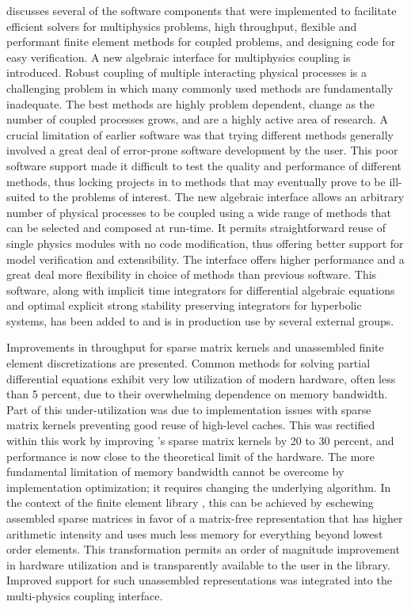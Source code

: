  discusses several of the software components that were implemented to facilitate efficient solvers for multiphysics problems, high throughput, flexible and performant finite element methods for coupled problems, and designing code for easy verification.
A new algebraic interface for multiphysics coupling is introduced.
Robust coupling of multiple interacting physical processes is a challenging problem in which many commonly used methods are fundamentally inadequate.
The best methods are highly problem dependent, change as the number of coupled processes grows, and are a highly active area of research.
A crucial limitation of earlier software was that trying different methods generally involved a great deal of error-prone software development by the user.
This poor software support made it difficult to test the quality and performance of different methods, thus locking projects in to methods that may eventually prove to be ill-suited to the problems of interest.
The new algebraic interface allows an arbitrary number of physical processes to be coupled using a wide range of methods that can be selected and composed at run-time.
It permits straightforward reuse of single physics modules with no code modification, thus offering better support for model verification and extensibility.
The interface offers higher performance and a great deal more flexibility in choice of methods than previous software.
This software, along with implicit time integrators for differential algebraic equations and optimal explicit strong stability preserving integrators for hyperbolic systems, has been added to {\PETSc} and is in production use by several external groups.

Improvements in throughput for sparse matrix kernels and unassembled finite element discretizations are presented.
Common methods for solving partial differential equations exhibit very low utilization of modern hardware, often less than 5 percent, due to their overwhelming dependence on memory bandwidth.
Part of this under-utilization was due to implementation issues with sparse matrix kernels preventing good reuse of high-level caches.
This was rectified within this work by improving \PETSc's sparse matrix kernels by 20 to 30 percent, and performance is now close to the theoretical limit of the hardware.
The more fundamental limitation of memory bandwidth cannot be overcome by implementation optimization; it requires changing the underlying algorithm.
In the context of the finite element library \Dohp, this can be achieved by eschewing assembled sparse matrices in favor of a matrix-free representation that has higher arithmetic intensity and uses much less memory for everything beyond lowest order elements.
This transformation permits an order of magnitude improvement in hardware utilization and is transparently available to the user in the {\Dohp} library.
Improved support for such unassembled representations was integrated into the multi-physics coupling interface.

